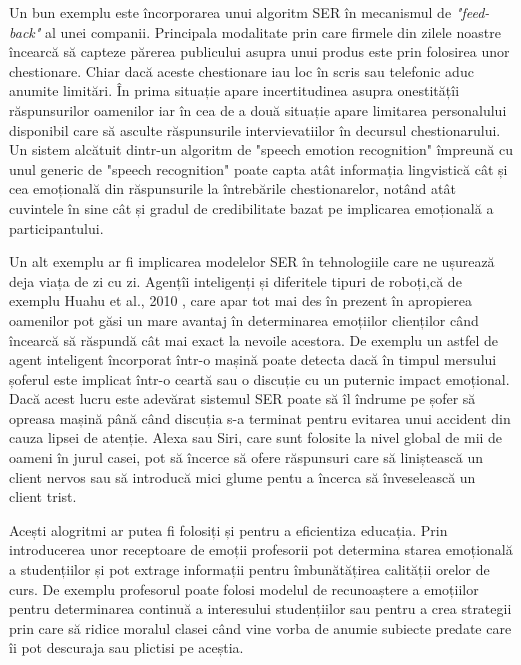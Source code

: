 \documentclass[a4paper,12pt]{book}
\begin{document}
					Un bun exemplu este încorporarea unui algoritm SER în mecanismul de \textit{"feed-back"} al unei companii. Principala modalitate prin care firmele din zilele noastre încearcă să capteze părerea publicului asupra unui produs este prin folosirea unor chestionare. Chiar dacă aceste chestionare iau loc în scris sau telefonic aduc anumite limitări. În prima situație apare incertitudinea asupra onestitățîi răspunsurilor oamenilor iar în cea de a două situație apare limitarea personalului disponibil care să asculte răspunsurile intervievatiilor în decursul chestionarului. Un sistem alcătuit dintr-un algoritm de "speech emotion recognition" împreună cu unul generic de "speech recognition" poate capta atât informația lingvistică cât și cea emoțională din răspunsurile la întrebările chestionarelor, notând atât cuvintele în sine cât și gradul de credibilitate bazat pe implicarea emoțională a participantului. \par
					
					Un alt exemplu ar fi implicarea modelelor SER în tehnologiile care ne ușurează deja viața de zi cu zi. Agențîi inteligenți și diferitele tipuri de roboți,că de exemplu Huahu et al., 2010 \cite{huahu}, care apar tot mai des în prezent în apropierea oamenilor pot găsi un mare avantaj în determinarea emoțiilor clienților când încearcă să răspundă cât mai exact la nevoile acestora. De exemplu un astfel de agent inteligent încorporat într-o mașină poate detecta dacă în timpul mersului șoferul este implicat într-o ceartă sau o discuție cu un puternic impact emoțional. Dacă acest lucru este adevărat sistemul SER poate să îl îndrume pe șofer să opreasa mașină până când discuția s-a terminat pentru evitarea unui accident din cauza lipsei de atenție. Alexa sau Siri, care sunt folosite la nivel  global de mii de oameni în jurul casei, pot să încerce să ofere răspunsuri care să liniștească un client nervos sau să introducă mici glume pentu a încerca să înveselească un client trist.\par 
					
					Acești alogritmi ar putea fi folosiți și pentru a eficientiza educația. Prin introducerea unor receptoare de emoții profesorii pot determina starea emoțională a studențiilor și pot extrage informații pentru îmbunătățirea calității orelor de curs. De exemplu profesorul poate folosi modelul de recunoaștere a emoțiilor pentru determinarea continuă a interesului studențiilor sau pentru a crea strategii prin care să ridice moralul clasei când vine vorba de anumie subiecte predate care îi pot descuraja sau plictisi pe aceștia. \par
					
\end{document}
